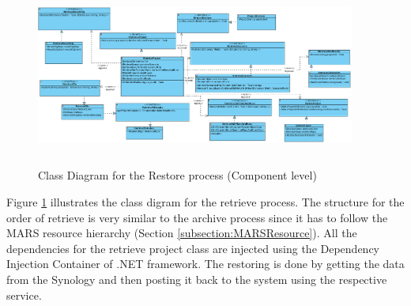\begin{figure}[H]
    \centering \includegraphics[height=6cm, angle=90, origin=c, width=10.5cm]{grafiken/restoreClass.png}
    \caption{Class Diagram for the Restore process (Component level)}
    \label{fig:restoreClass}
\end{figure}


Figure \ref{fig:restoreClass} illustrates the class digram for the retrieve process. The structure for the order of retrieve is very similar to the archive process
since it has to follow the MARS resource hierarchy (Section \ref{subsection:MARSResource}). All the dependencies for the retrieve project class are injected
using the Dependency Injection Container of .NET framework. The restoring is done by getting the data from the Synology and then posting it back to the system
using the respective service. 

